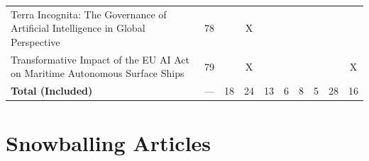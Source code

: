 \begin{landscape}
\begin{longtable}{|p{14cm}|c|c|c|c|c|c|c|c|c|}
		Terra Incognita: The Governance of Artificial Intelligence in Global Perspective                                                                        & 78          &                                    & X                                                         &                                                       &                                                            &                                           &                                              &                                                    &                                    \\
		Transformative Impact of the EU AI Act on Maritime Autonomous Surface Ships                                                                             & 79          &                                    & X                                                         &                                                       &                                                            &                                           &                                              &                                                    & X                                  \\
		\hline
		\textbf{Total (Included)}                                                                                                                               & ---         & 18                                 & 24                                                        & 13                                                    & 6                                                          & 8                                         & 5                                            & 28                                                 & 16                                 \\
		\hline
	\end{longtable}

	\section{Snowballing Articles}\label{sec:snowballing_articles_slr}


\end{landscape}
